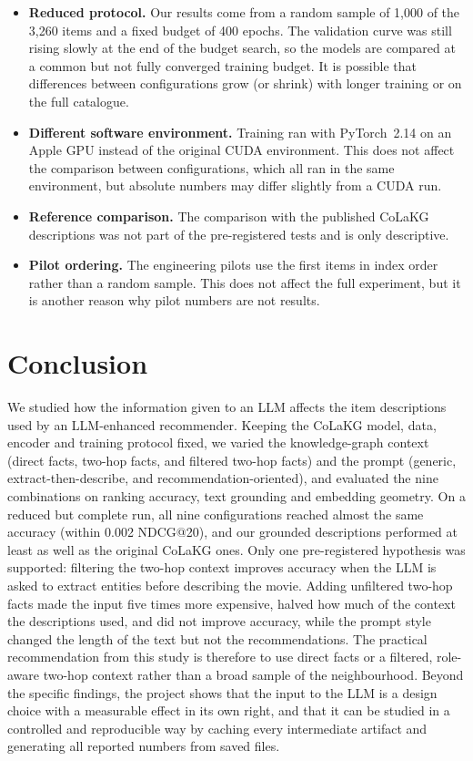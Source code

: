 \documentclass[a4paper,11pt]{article}
\begin{document}
\begin{itemize}
    \item \textbf{Reduced protocol.} Our results come from a random sample of 1,000 of the 3,260 items and a fixed budget of 400 epochs. The validation curve was still rising slowly at the end of the budget search, so the models are compared at a common but not fully converged training budget. It is possible that differences between configurations grow (or shrink) with longer training or on the full catalogue.
    \item \textbf{Different software environment.} Training ran with PyTorch~2.14 on an Apple GPU instead of the original CUDA environment. This does not affect the comparison between configurations, which all ran in the same environment, but absolute numbers may differ slightly from a CUDA run.
    \item \textbf{Reference comparison.} The comparison with the published CoLaKG descriptions was not part of the pre-registered tests and is only descriptive.
    \item \textbf{Pilot ordering.} The engineering pilots use the first items in index order rather than a random sample. This does not affect the full experiment, but it is another reason why pilot numbers are not results.
\end{itemize}

\section{Conclusion}
\label{sec:conclusion}
We studied how the information given to an LLM affects the item descriptions used by an LLM-enhanced recommender. Keeping the CoLaKG model, data, encoder and training protocol fixed, we varied the knowledge-graph context (direct facts, two-hop facts, and filtered two-hop facts) and the prompt (generic, extract-then-describe, and recommendation-oriented), and evaluated the nine combinations on ranking accuracy, text grounding and embedding geometry. On a reduced but complete run, all nine configurations reached almost the same accuracy (within 0.002 NDCG@20), and our grounded descriptions performed at least as well as the original CoLaKG ones. Only one pre-registered hypothesis was supported: filtering the two-hop context improves accuracy when the LLM is asked to extract entities before describing the movie. Adding unfiltered two-hop facts made the input five times more expensive, halved how much of the context the descriptions used, and did not improve accuracy, while the prompt style changed the length of the text but not the recommendations. The practical recommendation from this study is therefore to use direct facts or a filtered, role-aware two-hop context rather than a broad sample of the neighbourhood. Beyond the specific findings, the project shows that the input to the LLM is a design choice with a measurable effect in its own right, and that it can be studied in a controlled and reproducible way by caching every intermediate artifact and generating all reported numbers from saved files.
\end{document}
